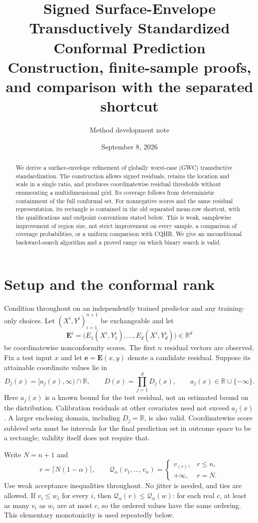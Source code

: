 \documentclass[11pt]{article}
\title{Signed Surface-Envelope Transductively Standardized Conformal Prediction\\
\large Construction, finite-sample proofs, and comparison with the separated shortcut}
\author{Method development note}
\date{September 8, 2026}
\newcommand{\R}{\mathbb R}
\newcommand{\E}{\mathbf E}
\newcommand{\evec}{\mathbf e}
\newcommand{\Q}{\mathcal Q_\alpha}
\begin{document}
\maketitle
\begin{abstract}
We derive a surface-envelope refinement of globally worst-case (GWC)
transductive standardization. The construction allows signed residuals, retains
the location and scale in a single ratio, and produces coordinatewise residual
thresholds without enumerating a multidimensional grid. Its coverage follows
from deterministic containment of the full conformal set. For nonnegative
scores and the same residual representation, its rectangle is contained in the
old separated mean-row shortcut, with the qualifications and endpoint
conventions stated below. This is weak, samplewise improvement of region size,
not strict improvement on every sample, a comparison of coverage probabilities,
or a uniform comparison with CQHR. We give an unconditional backward-search
algorithm and a proved range on which binary search is valid.
\end{abstract}
\tableofcontents

\section{Setup and the conformal rank}
Condition throughout on an independently trained predictor and any training-only
choices. Let $(X^i,Y^i)_{i=1}^{n+1}$ be exchangeable and let
\[
 \E^i=\big(E_1(X^i,Y^i_1),\ldots,E_d(X^i,Y^i_d)\big)\in\R^d
\]
be coordinatewise nonconformity scores. The first $n$ residual vectors are
observed. Fix a test input $x$ and let $\evec=\E(x,y)$ denote a candidate
residual. Suppose its attainable coordinate values lie in
\[
 D_j(x)=[a_j(x),\infty)\cap\R,\qquad
 D(x)=\prod_{j=1}^d D_j(x),\qquad a_j(x)\in\R\cup\{-\infty\}.
\]
Here $a_j(x)$ is a known bound for the test residual, not an estimated bound on
the distribution. Calibration residuals at other covariates need not exceed
$a_j(x)$. A larger enclosing domain, including $D_j=\R$, is also valid.
Coordinatewise score sublevel sets must be intervals for the final prediction
set in outcome space to be a rectangle; validity itself does not require that.

Write $N=n+1$ and
\begin{equation}\label{eq:quantile}
 r=\lceil N(1-\alpha)\rceil,\qquad
 \Q(v_1,\ldots,v_n)=
 \begin{cases}v_{(r)},&r\le n,\\+\infty,&r=N.\end{cases}
\end{equation}
Use weak acceptance inequalities throughout. No jitter is needed, and ties are
allowed. If $v_i\le w_i$ for every $i$, then $\Q(v)\le\Q(w)$: for each real
$c$, at least as many $v_i$ as $w_i$ are at most $c$, so the ordered values have
the same ordering. This elementary monotonicity is used repeatedly below.
\end{document}
